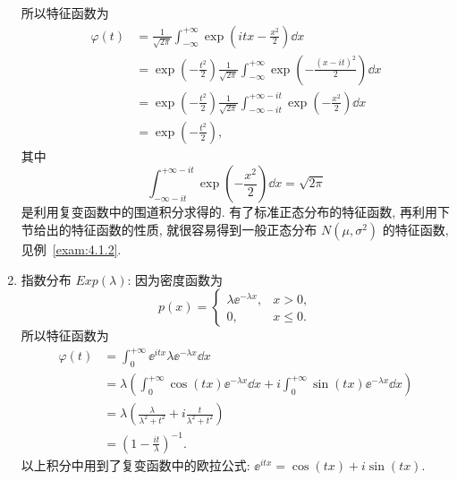 \begin{example}
\begin{enumerate}
\begin{equation*}
        \end{equation*}
        所以特征函数为
        \begin{align*}
            \varphi (t) & = \frac{1}{\sqrt{2\pi}} \int_{-\infty}^{+\infty} \exp \left( itx - \frac{x^2}{2} \right) \dd x\\
            & = \exp \left( -\frac{t^2}{2} \right) \frac{1}{\sqrt{2\pi}} \int_{-\infty}^{+\infty} \exp \left( -\frac{( x - it )^2}{2} \right) \dd x\\
            & = \exp \left( -\frac{t^2}{2} \right) \frac{1}{\sqrt{2\pi}} \int_{-\infty -it}^{+\infty -it} \exp \left( -\frac{x^2}{2} \right) \dd x\\
            & = \exp \left( -\frac{t^2}{2} \right),
        \end{align*}
        其中
        \begin{equation*}
            \int_{-\infty -it}^{+\infty -it} \exp \left( -\frac{x^2}{2} \right) \dd x = \sqrt{2\pi}
        \end{equation*}
        是利用复变函数中的围道积分求得的.
        有了标准正态分布的特征函数,
        再利用下节给出的特征函数的性质,
        就很容易得到一般正态分布 $ N ( \mu, \sigma^2 ) $ 的特征函数,
        见例~\ref{exam:4.1.2}.
        \item
        {\heiti 指数分布} $ Exp ( \lambda ) $: 因为密度函数为
        \begin{equation*}
            p (x) =
            \begin{cases}
                \lambda \ee^{-\lambda x}, & x > 0,\\
                0, & x \leq 0.
            \end{cases}
        \end{equation*}
        所以特征函数为
        \begin{align*}
            \varphi (t) & = \int_0^{+\infty} \ee^{itx} \lambda \ee^{-\lambda x} \dd x\\
            & = \lambda \left( \int_0^{+\infty} \cos (tx) \ee^{-\lambda x} \dd x + i \int_0^{+\infty} \sin (tx) \ee^{-\lambda x} \dd x \right)\\
            & = \lambda \left( \frac{\lambda}{\lambda^2 + t^2} + i \frac{t}{\lambda^2 + t^2} \right)\\
            & = \left( 1 - \frac{it}{\lambda} \right)^{-1}.
        \end{align*}
        以上积分中用到了复变函数中的欧拉公式: $ \ee^{itx} = \cos (tx) + i \sin ( tx) $.
    \end{enumerate}
\end{example}

